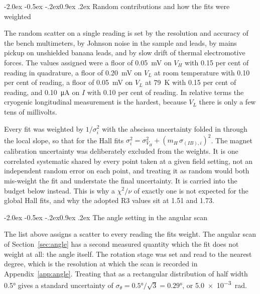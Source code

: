 \documentclass[11pt,a4paper]{article}
\makeatletter
\renewcommand\subsection{\@startsection{subsection}{2}{\z@}%
  {-2.0ex \@plus -0.5ex \@minus -.2ex}{0.9ex \@plus .2ex}%
  {\normalfont\normalsize\bfseries}}
\makeatother
\begin{document}
\subsection{Random contributions and how the fits were weighted}

The random scatter on a single reading is set by the resolution and accuracy of the bench
multimeters, by Johnson noise in the sample and leads, by mains pickup on unshielded banana
leads, and by slow drift of thermal electromotive forces. The values assigned were a floor of
\qty{0.05}{\milli\volt} on $V_H$ with \num{0.15} per cent of reading in quadrature, a floor
of \qty{0.20}{\milli\volt} on $V_L$ at room temperature with \num{0.10} per cent of reading,
a floor of \qty{0.05}{\milli\volt} on $V_L$ at \qty{79}{\kelvin} with \num{0.15} per cent of
reading, and \qty{0.10}{\micro\ampere} on $I$ with \num{0.10} per cent of reading. In
relative terms the cryogenic longitudinal measurement is the hardest, because $V_L$ there is
only a few tens of millivolts.

Every fit was weighted by $1/\sigma_i^2$ with the abscissa uncertainty folded in through the
local slope, so that for the Hall fits
$\sigma_i^2 = \sigma_{V_H}^2 + (m_H\,\sigma_{(IB),i})^2$. The magnet calibration uncertainty
was deliberately excluded from the weights. It is one correlated systematic shared by every
point taken at a given field setting, not an independent random error on each point, and
treating it as random would both mis-weight the fit and understate the final uncertainty. It
is carried into the budget below instead. This is why a $\chi^2/\nu$ of exactly one is not
expected for the global Hall fits, and why the adopted R3 values sit at \num{1.51} and
\num{1.73}.

\subsection{The angle setting in the angular scan}
\label{sec:angleuncert}

The list above assigns a scatter to every reading the fits weight. The angular scan of
Section~\ref{sec:angle} has a second measured quantity which the fit does not weight at all:
the angle itself. The rotation stage was set and read to the nearest degree, which is the
resolution at which the scan is recorded in Appendix~\ref{app:angle}. Treating that as a
rectangular distribution of half width \ang{0.5} gives a standard uncertainty of
$\sigma_\theta = \ang{0.5}/\sqrt{3} = \ang{0.29}$, or \qty{5.0e-3}{\radian}.
\end{document}
